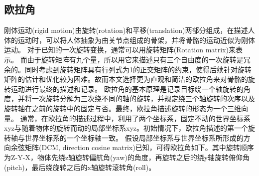 \subsection{欧拉角}{}
刚体运动(rigid motion)由旋转(rotation)和平移(translation)两部分组成，在描述人体的运动时，可以将人体抽象为由关节点组成的骨架，并将骨骼的运动近似为刚体运动。
对于已知的一次旋转变换，通常可以用旋转矩阵(Rotation matrix)来表示。
而由于旋转矩阵有九个量，所以用它来描述只有三个自由度的一次旋转是冗余的。同时考虑到旋转矩阵具有行列式为1的正交矩阵的约束，使得后续针对旋转矩阵的估计和优化较为困难。故而本文选择更为直观和简洁的欧拉角来对骨骼的旋转运动进行最终的描述和记录。
欧拉角的基本原理是记录目标绕一个轴旋转的角度，并将一次旋转分解为三次绕不同的轴的旋转，并规定绕三个轴旋转的次序以及旋转轴在之前的旋转中的固定与否。最终，欧拉角描述旋转的形态为一个三维向量。
通常，在欧拉角的描述过程中，利用了两个坐标系，固定不动的世界坐标系xyz与随着物体的旋转而动的局部坐标系xyz。初始情况下，欧拉角描述的第一个旋转轴与世界坐标系的一个坐标轴一致。
假设局部坐标系与世界坐标系所形成的方向余弦矩阵(DCM, direction cosine matrix)已知，可得欧拉角如下。其中旋转顺序为Z-Y-X，物体先绕z轴旋转偏航角(yaw)的角度，再旋转之后的绕y轴旋转俯仰角(pitch)，最后绕旋转之后的x轴旋转滚转角(roll)。
